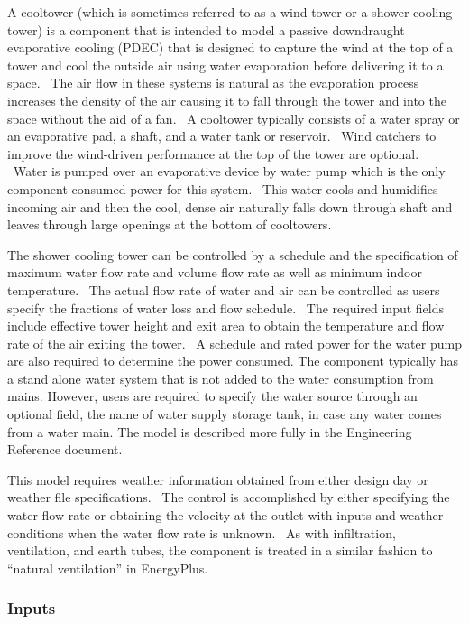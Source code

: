 A cooltower (which is sometimes referred to as a wind tower or a shower cooling tower) is a component that is intended to model a passive downdraught evaporative cooling (PDEC) that is designed to capture the wind at the top of a tower and cool the outside air using water evaporation before delivering it to a space.~ The air flow in these systems is natural as the evaporation process increases the density of the air causing it to fall through the tower and into the space without the aid of a fan. ~A cooltower typically consists of a water spray or an evaporative pad, a shaft, and a water tank or reservoir. ~Wind catchers to improve the wind-driven performance at the top of the tower are optional. ~Water is pumped over an evaporative device by water pump which is the only component consumed power for this system.~ This water cools and humidifies incoming air and then the cool, dense air naturally falls down through shaft and leaves through large openings at the bottom of cooltowers.

The shower cooling tower can be controlled by a schedule and the specification of maximum water flow rate and volume flow rate as well as minimum indoor temperature.~ The actual flow rate of water and air can be controlled as users specify the fractions of water loss and flow schedule.~ The required input fields include effective tower height and exit area to obtain the temperature and flow rate of the air exiting the tower.~ A schedule and rated power for the water pump are also required to determine the power consumed. The component typically has a stand alone water system that is not added to the water consumption from mains. However, users are required to specify the water source through an optional field, the name of water supply storage tank, in case any water comes from a water main. The model is described more fully in the Engineering Reference document.

This model requires weather information obtained from either design day or weather file specifications. ~The control is accomplished by either specifying the water flow rate or obtaining the velocity at the outlet with inputs and weather conditions when the water flow rate is unknown.~ As with infiltration, ventilation, and earth tubes, the component is treated in a similar fashion to ``natural ventilation'' in EnergyPlus.

\subsubsection{Inputs}\label{inputs-8-002}

